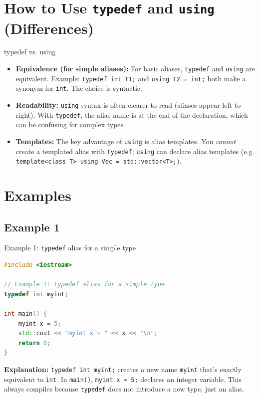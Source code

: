 \documentclass{beamer}
\begin{document}
\section{How to Use \texttt{typedef} and \texttt{using} (Differences)}
\begin{frame}{typedef vs. using}
\begin{itemize}
\item \textbf{Equivalence (for simple aliases):} For basic aliases, \texttt{typedef} and \texttt{using} are equivalent. Example: \texttt{typedef int T1;} and \texttt{using T2 = int;} both make a synonym for \texttt{int}. The choice is syntactic.
\item \textbf{Readability:} \texttt{using} syntax is often clearer to read (aliases appear left-to-right). With \texttt{typedef}, the alias name is at the end of the declaration, which can be confusing for complex types.
\item \textbf{Templates:} The key advantage of \texttt{using} is alias templates. You \textsl{cannot} create a templated alias with \texttt{typedef}; \texttt{using} can declare alias templates (e.g. \texttt{template<class T> using Vec = std::vector<T>;}).
\end{itemize}
\end{frame}
\section{Examples}
\subsection{Example 1}
\begin{frame}[fragile]{Example 1: \texttt{typedef} alias for a simple type}
\begin{lstlisting}[language=C++]
#include <iostream>

// Example 1: typedef alias for a simple type
typedef int myint;

int main() {
    myint x = 5;
    std::cout << "myint x = " << x << "\n";
    return 0;
}
\end{lstlisting}
\textbf{Explanation:}
\texttt{typedef int myint;} creates a new name \texttt{myint} that’s exactly equivalent to \texttt{int}. In \texttt{main()}, \texttt{myint x = 5;} declares an integer variable. This always compiles because \texttt{typedef} does not introduce a new type, just an alias.
\end{frame}
\end{document}
